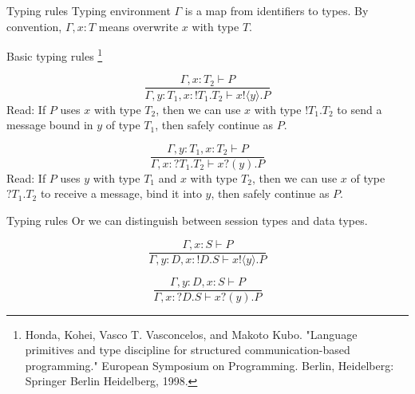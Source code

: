 \begin{frame}{Typing rules}
  Typing environment $\Gamma$ is a map from identifiers to types. By convention, $\Gamma, x: T$ means overwrite $x$ with type $T$.

  Basic typing rules \footnote{Honda, Kohei, Vasco T. Vasconcelos, and Makoto Kubo. "Language primitives and type discipline for structured communication-based programming." European Symposium on Programming. Berlin, Heidelberg: Springer Berlin Heidelberg, 1998.}
  \begin{center}
    \begin{minipage}{0.48\textwidth}
      $$\dfrac{\Gamma, x: T_2 \vdash P}{\Gamma, y:T_1, x:!T_1.T_2 \vdash x!\langle y\rangle.P}$$
      Read: If $P$ uses $x$ with type $T_2$, then we can use $x$ with type $!T_1.T_2$ to send a message bound in $y$ of type $T_1$, then safely continue as $P$.
    \end{minipage}
    \hfill
    \begin{minipage}{0.48\textwidth}
      $$\dfrac{\Gamma, y: T_1, x: T_2 \vdash P}{\Gamma, x:?T_1.T_2 \vdash x?(y).P}$$
      Read: If $P$ uses $y$ with type $T_1$ and $x$ with type $T_2$, then we can use $x$ of type $?T_1.T_2$ to receive a message, bind it into $y$, then safely continue as $P$.
    \end{minipage}
  \end{center}
\end{frame}

\begin{frame}{Typing rules}
  Or we can distinguish between session types and data types.
  \begin{center}
    \begin{minipage}{0.48\textwidth}
      $$\dfrac{\Gamma, x: S \vdash P}{\Gamma, y:D, x:!D.S \vdash x!\langle y\rangle.P}$$
    \end{minipage}
    \hfill
    \begin{minipage}{0.48\textwidth}
      $$\dfrac{\Gamma, y: D, x: S \vdash P}{\Gamma, x:?D.S \vdash x?(y).P}$$
    \end{minipage}
  \end{center}
\end{frame}

